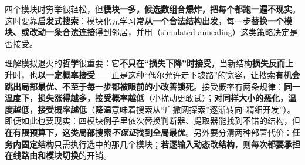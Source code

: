 四个模块时穷举很轻松，但\textbf{模块一多，候选数组合爆炸，把每个都跑一遍不现实}。这时要靠\textbf{启发式搜索}：模块化元学习常\textbf{从一个合法结构出发}，每一步\textbf{替换一个模块、或改动一条合法连接}得到邻居，并用（simulated annealing）这类策略决定是否接受。

理解模拟退火的\textbf{哲学}很重要：它\textbf{不只在“损失下降”时接受}，当新结构\textbf{损失反而上升}时，也\textbf{以一定概率接受}——正是这种“偶尔允许走下坡路”的宽容，让搜索\textbf{有机会跳出局部最优、不至于每一步都被眼前的小改善锁死}。接受概率有两条规律：\textbf{同一温度下，损失涨得越多，接受概率越低}（小扰动更敢试）；\textbf{对同样大小的恶化，温度越低，接受概率越低}（\textbf{降温}意味着搜索从“广撒网探索”逐渐转向“精细开发”）。即便如此也要现实：四模块例子里依次替换判断器、提取器能找到不错的结构，但\textbf{在有限预算下，这类局部搜索\emph{不保证}找到全局最优}。另外要分清两种部署代价：\textbf{任务内固定结构}只需执行选中的那几个模块；\textbf{若逐输入动态改结构}，则\textbf{每次都要承担在线路由和模块切换}的开销。

